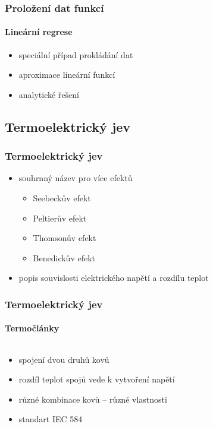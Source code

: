 \documentclass[smaller,aspectratio=1610,handout]{beamer}
\begin{document}
\begin{frame}
	\frametitle{Proložení dat funkcí}
	\framesubtitle{Lineární regrese}
	\begin{itemize}
		\item speciální případ prokládání dat
		\item aproximace lineární funkcí
		\item analytické řešení
	\end{itemize}
\end{frame}

\subsection{Termoelektrický jev}

\begin{frame}
	\frametitle{Termoelektrický jev}
	\begin{itemize}
		\item souhrnný název pro více efektů
			\begin{itemize}
				\item Seebeckův efekt
				\item Peltierův efekt
				\item Thomsonův efekt
				\item Benedickův efekt
			\end{itemize}
		\item popis souvislosti elektrického napětí a rozdílu teplot
	\end{itemize}
\end{frame}

\begin{frame}
	\frametitle{Termoelektrický jev}
	\framesubtitle{Termočlánky}
	\begin{columns}
		\begin{column}{0.6\textwidth}
			\begin{itemize}
				\item spojení dvou druhů kovů
				\item rozdíl teplot spojů vede k vytvoření napětí
				\item různé kombinace kovů -- různé vlastnosti
				\item standart IEC 584
			\end{itemize}
		\end{column}
		\begin{column}{0.4\textwidth}
		\end{column}
	\end{columns}
\end{frame}
\end{document}
